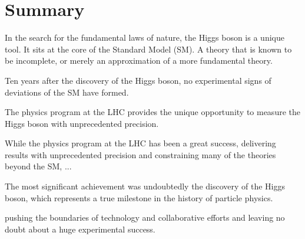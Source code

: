 \chapter{Summary}
\label{chap:summary}



In the search for the fundamental laws of nature, the Higgs boson is a unique tool. 
It sits at the core of the Standard Model (SM). A theory that is known to be incomplete, or merely an approximation of a more fundamental theory. 

Ten years after the discovery of the Higgs boson, no experimental signs of deviations of the SM have formed. 

The physics program at the LHC provides the unique opportunity to measure the Higgs boson with unprecedented precision. 


While the physics program at the LHC has been a great success, delivering results with unprecedented precision and constraining many of the theories beyond the SM, ...

The most significant achievement was undoubtedly the discovery of the Higgs boson, which represents a true milestone in the history of particle physics. 

pushing the boundaries of technology and collaborative efforts and leaving no doubt about a huge experimental success.


